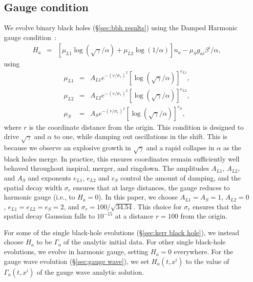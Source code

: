 \begin{bibunit}[unsrtnat]
\subsection{Gauge condition}\label{sec:dh_gauge}
We evolve binary black holes (\S\ref{sec:bbh results}) using the Damped Harmonic
gauge condition~\cite{Szilagyi:2009qz, Deppe2018:uye}:
\begin{eqnarray}\label{eq:dh_gauge_source}
  H_a &=& \left[\mu_{L1} \log\left(\sqrt{\gamma}/\alpha\right) + \mu_{L2}
          \log\left(1/\alpha\right)\right] n_a - \mu_S g_{ai} \beta^i / \alpha,
\end{eqnarray}
using
\begin{eqnarray}
  \label{eq:dh_mu1}
  \mu_{L1} &=& A_{L1} e^{-(r/\sigma_r)^2}
               \left[\log(\sqrt{\gamma}/\alpha)\right]^{e_{L1}},\\
  \label{eq:dh_mu2}
  \mu_{L2} &=& A_{L2} e^{-(r/\sigma_r)^2}
               \left[\log(\sqrt{\gamma}/\alpha)\right]^{e_{L2}},\\
  \label{eq:dh_mu3}
  \mu_{S} &=& A_{S} e^{-(r/\sigma_r)^2}
              \left[\log(\sqrt{\gamma}/\alpha)\right]^{e_{S}},
\end{eqnarray} where $r$ is the coordinate distance from the origin. This
condition is designed to drive $\sqrt{\gamma}$ and $\alpha$ to one, while damping
out oscillations in the shift. This is because we observe an explosive growth in
$\sqrt{\gamma}$ and a rapid collapse in $\alpha$ as the black holes merge. In
practice, this ensures coordinates remain sufficiently well behaved throughout
inspiral, merger, and ringdown. The amplitudes $A_{L1}$, $A_{L2}$, and $A_{S}$ and
exponents $e_{L1}$, $e_{L2}$ and $e_{S}$ control the amount of damping, and the
spatial decay width $\sigma_r$ ensures that at large distances, the gauge reduces
to harmonic gauge (i.e., to $H_a = 0$). In this paper, we choose
$A_{L1}=A_S = 1$, $A_{L2}=0$, $e_{L1}=e_{L2}=e_{S}=2$, and $\sigma_r = 100 /
\sqrt{34.54}$. This choice for $\sigma_r$ ensures that the spatial decay
Gaussian falls to $10^{-15}$ at a distance $r=100$ from the origin.

For some of the single black-hole evolutions (\S\ref{sec:kerr black hole}), we
instead choose $H_a$ to be $\Gamma_a$ of the analytic initial data. For other
single black-hole evolutions, we evolve in harmonic gauge, setting $H_a=0$
everywhere.  For the gauge wave evolution (\S\ref{sec:gauge wave}), we set
$H_a(t, x^i)$ to the value of $\Gamma_a(t, x^i)$ of the gauge wave analytic
solution.


\end{bibunit}
